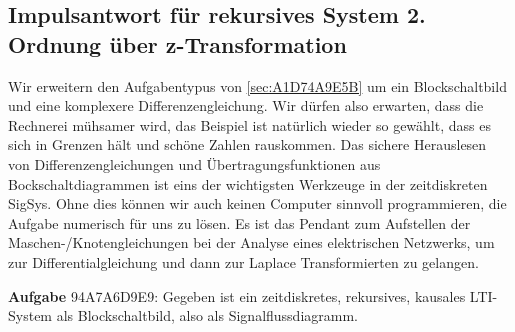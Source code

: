\newpage
\subsection{Impulsantwort für rekursives System 2. Ordnung über z-Transformation}
\label{sec:94A7A6D9E9}
\begin{Ziel}
Wir erweitern den Aufgabentypus von \ref{sec:A1D74A9E5B} um ein Blockschaltbild
und eine komplexere Differenzengleichung. Wir dürfen also erwarten, dass
die Rechnerei mühsamer wird, das Beispiel ist natürlich wieder so gewählt, dass
es sich in Grenzen hält und schöne Zahlen rauskommen. Das sichere Herauslesen
von Differenzengleichungen und Übertragungsfunktionen aus Bockschaltdiagrammen
ist eins der wichtigsten Werkzeuge in der zeitdiskreten SigSys. Ohne dies
können wir auch keinen Computer sinnvoll programmieren, die Aufgabe numerisch
für uns zu lösen. Es ist das Pendant
zum Aufstellen der Maschen-/Knotengleichungen bei der Analyse eines elektrischen
Netzwerks, um zur Differentialgleichung und dann zur Laplace Transformierten
zu gelangen.
\end{Ziel}
\textbf{Aufgabe} {\tiny 94A7A6D9E9}: Gegeben ist ein zeitdiskretes, rekursives,
kausales LTI-System als Blockschaltbild, also als Signalflussdiagramm.
